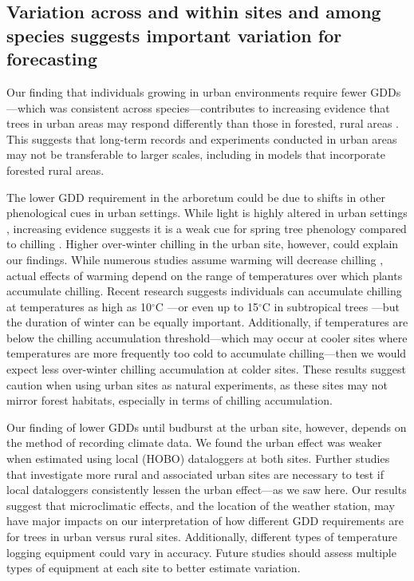 \documentclass{article}\usepackage[]{graphicx}\usepackage[]{color}
\newcommand{\R}[1]{\label{#1}\linelabel{#1}}
\begin{document}
\subsection{Variation across and within sites and among species suggests important variation for forecasting} 
Our finding that individuals growing in urban environments require fewer GDDs---which was consistent across species---contributes to increasing evidence that trees in urban areas may respond differently than those in forested, rural areas \citep{Meng2020}. This suggests that long-term records and experiments conducted in urban areas may not be transferable to larger scales, including in models that incorporate forested rural areas. 

\R{Z2chillstart}The lower GDD requirement in the arboretum could be due to shifts in other phenological cues in urban settings. While light is highly altered in urban settings \citep{Jochner2015}, increasing evidence suggests it is a weak cue for spring tree phenology compared to chilling \citep{Ettinger2020}. Higher over-winter chilling in the urban site, however, could explain our findings. While numerous studies assume warming will decrease chilling \citep{Luedeling2011,Fu2015,Asse2018}, actual effects of warming depend on the range of temperatures over which plants accumulate chilling. Recent research suggests individuals can accumulate chilling at temperatures as high as 10$^{\circ}$C \citep{Baumgarten2021}---or even up to 15$^{\circ}$C in subtropical trees \citep{Zhang2021}---but the duration of winter can be equally important. Additionally, if temperatures are below the chilling accumulation threshold---which may occur at cooler sites where temperatures are more frequently too cold to accumulate chilling---then we would expect less over-winter chilling accumulation at colder sites. These results suggest caution when using urban sites as natural experiments, as these sites may not mirror forest habitats, especially in terms of chilling accumulation. \R{Z2chillend}

Our finding of lower GDDs until budburst at the urban site, however, depends on the method of recording climate data. We found the urban effect was weaker when estimated using local (HOBO) dataloggers at both sites. Further studies that investigate more rural and associated urban sites are necessary to test if local dataloggers consistently lessen the urban effect---as we saw here. Our results suggest that microclimatic effects, and the location of the weather station, may have major impacts on our interpretation of how different GDD requirements are for trees in urban versus rural sites. Additionally, different types of temperature logging equipment could vary in accuracy. Future studies should assess multiple types of equipment at each site to better estimate variation. 
\end{document}
